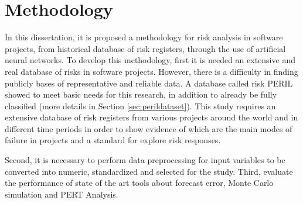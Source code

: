 \chapter{Methodology}\label{cap:methodology}

In this dissertation, it is proposed a methodology for risk analysis in software projects, from historical database of risk registers, through the use of artificial neural networks. To develop this methodology, first it is needed an extensive and real database of risks in software projects. However, there is a difficulty in finding publicly bases of representative and reliable data. A database called risk PERIL \cite{kendrick2003identifying} showed  to meet basic needs for this research, in addition to already be fully classified (more details in Section \ref{sec:perildataset}). This study requires an extensive database of risk registers from various projects around the world and in different time periods in order to show evidence of which are the main modes of failure in projects and a standard for explore risk responses.

Second, it is necessary to perform data preprocessing for input variables to be converted into numeric, standardized and selected for the study. Third, evaluate the performance of state of the art tools about forecast error, Monte Carlo simulation and PERT Analysis.

